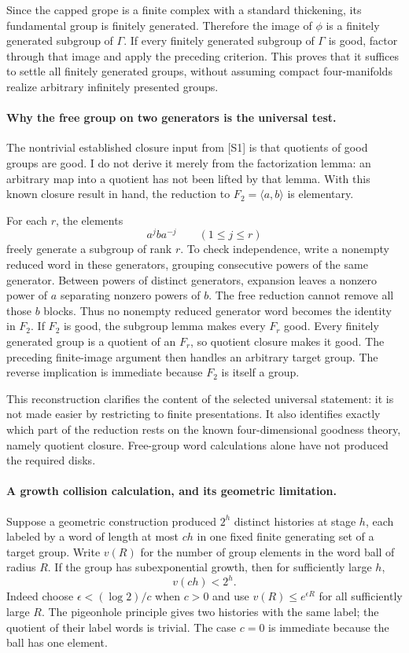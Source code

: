 \documentclass[11pt]{article}
\begin{document}
Since the capped grope is a finite complex with a standard thickening,
its fundamental group is finitely generated. Therefore the image of
$\phi$ is a finitely generated subgroup of $\Gamma$. If every finitely
generated subgroup of $\Gamma$ is good, factor through that image
and apply the preceding criterion. This proves that it suffices to
settle all finitely generated groups, without assuming compact
four-manifolds realize arbitrary infinitely presented groups.

\paragraph{Why the free group on two generators is the universal test.}
The nontrivial established closure input from [S1] is that quotients
of good groups are good. I do not derive it merely from the
factorization lemma: an arbitrary map into a quotient has not been
lifted by that lemma. With this known closure result in hand, the
reduction to $F_2=\langle a,b\rangle$ is elementary.

For each $r$, the elements
\[
                 a^jba^{-j}\qquad(1\le j\le r)
\]
freely generate a subgroup of rank $r$. To check independence, write
a nonempty reduced word in these generators, grouping consecutive
powers of the same generator. Between powers of distinct generators,
expansion leaves a nonzero power of $a$ separating nonzero powers of
$b$. The free reduction cannot remove all those $b$ blocks. Thus no
nonempty reduced generator word becomes the identity in $F_2$.
If $F_2$ is good, the subgroup lemma makes every $F_r$ good.
Every finitely generated group is a quotient of an $F_r$, so quotient
closure makes it good. The preceding finite-image argument then handles
an arbitrary target group. The reverse implication is immediate because
$F_2$ is itself a group.

This reconstruction clarifies the content of the selected universal
statement: it is not made easier by restricting to finite presentations.
It also identifies exactly which part of the reduction rests on the
known four-dimensional goodness theory, namely quotient closure.
Free-group word calculations alone have not produced the required disks.

\paragraph{A growth collision calculation, and its geometric limitation.}
Suppose a geometric construction produced $2^h$ distinct histories at
stage $h$, each labeled by a word of length at most $ch$ in one fixed
finite generating set of a target group. Write $v(R)$ for the number
of group elements in the word ball of radius $R$. If the group has
subexponential growth, then for sufficiently large $h$,
\[
                              v(ch)<2^h.
\]
Indeed choose $\epsilon<(\log2)/c$ when $c>0$ and use
$v(R)\le e^{\epsilon R}$ for all sufficiently large $R$.
The pigeonhole principle gives two histories with the same label;
the quotient of their label words is trivial. The case $c=0$ is
immediate because the ball has one element.
\end{document}
